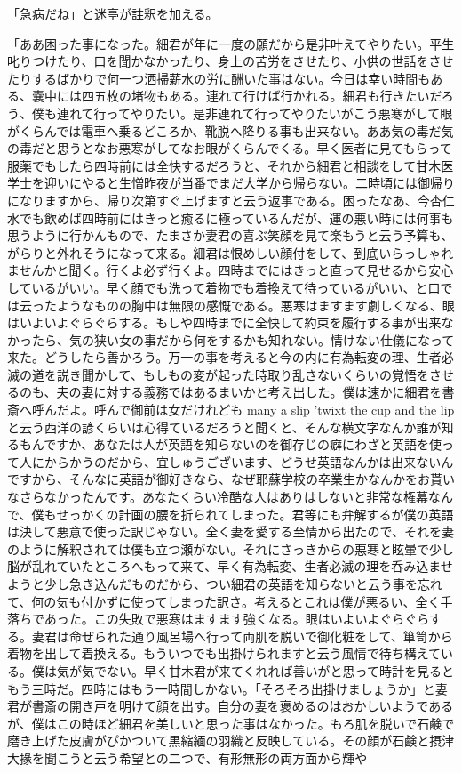 \documentclass[12pt, openright]{book}
\begin{document}
「急病だね」と迷亭が註釈を加える。

「ああ困った事になった。細君が年に一度の願だから是非叶えてやりたい。平生叱りつけたり、口を聞かなかったり、身上の苦労をさせたり、小供の世話をさせたりするばかりで何一つ洒掃薪水の労に酬いた事はない。今日は幸い時間もある、嚢中には四五枚の堵物もある。連れて行けば行かれる。細君も行きたいだろう、僕も連れて行ってやりたい。是非連れて行ってやりたいがこう悪寒がして眼がくらんでは電車へ乗るどころか、靴脱へ降りる事も出来ない。ああ気の毒だ気の毒だと思うとなお悪寒がしてなお眼がくらんでくる。早く医者に見てもらって服薬でもしたら四時前には全快するだろうと、それから細君と相談をして甘木医学士を迎いにやると生憎昨夜が当番でまだ大学から帰らない。二時頃には御帰りになりますから、帰り次第すぐ上げますと云う返事である。困ったなあ、今杏仁水でも飲めば四時前にはきっと癒るに極っているんだが、運の悪い時には何事も思うように行かんもので、たまさか妻君の喜ぶ笑顔を見て楽もうと云う予算も、がらりと外れそうになって来る。細君は恨めしい顔付をして、到底いらっしゃれませんかと聞く。行くよ必ず行くよ。四時までにはきっと直って見せるから安心しているがいい。早く顔でも洗って着物でも着換えて待っているがいい、と口では云ったようなものの胸中は無限の感慨である。悪寒はますます劇しくなる、眼はいよいよぐらぐらする。もしや四時までに全快して約束を履行する事が出来なかったら、気の狭い女の事だから何をするかも知れない。情けない仕儀になって来た。どうしたら善かろう。万一の事を考えると今の内に有為転変の理、生者必滅の道を説き聞かして、もしもの変が起った時取り乱さないくらいの覚悟をさせるのも、夫の妻に対する義務ではあるまいかと考え出した。僕は速かに細君を書斎へ呼んだよ。呼んで御前は女だけれども many a slip 'twixt the cup and the lip と云う西洋の諺くらいは心得ているだろうと聞くと、そんな横文字なんか誰が知るもんですか、あなたは人が英語を知らないのを御存じの癖にわざと英語を使って人にからかうのだから、宜しゅうございます、どうせ英語なんかは出来ないんですから、そんなに英語が御好きなら、なぜ耶蘇学校の卒業生かなんかをお貰いなさらなかったんです。あなたくらい冷酷な人はありはしないと非常な権幕なんで、僕もせっかくの計画の腰を折られてしまった。君等にも弁解するが僕の英語は決して悪意で使った訳じゃない。全く妻を愛する至情から出たので、それを妻のように解釈されては僕も立つ瀬がない。それにさっきからの悪寒と眩暈で少し脳が乱れていたところへもって来て、早く有為転変、生者必滅の理を呑み込ませようと少し急き込んだものだから、つい細君の英語を知らないと云う事を忘れて、何の気も付かずに使ってしまった訳さ。考えるとこれは僕が悪るい、全く手落ちであった。この失敗で悪寒はますます強くなる。眼はいよいよぐらぐらする。妻君は命ぜられた通り風呂場へ行って両肌を脱いで御化粧をして、箪笥から着物を出して着換える。もういつでも出掛けられますと云う風情で待ち構えている。僕は気が気でない。早く甘木君が来てくれれば善いがと思って時計を見るともう三時だ。四時にはもう一時間しかない。「そろそろ出掛けましょうか」と妻君が書斎の開き戸を明けて顔を出す。自分の妻を褒めるのはおかしいようであるが、僕はこの時ほど細君を美しいと思った事はなかった。もろ肌を脱いで石鹸で磨き上げた皮膚がぴかついて黒縮緬の羽織と反映している。その顔が石鹸と摂津大掾を聞こうと云う希望との二つで、有形無形の両方面から輝や
\end{document}

